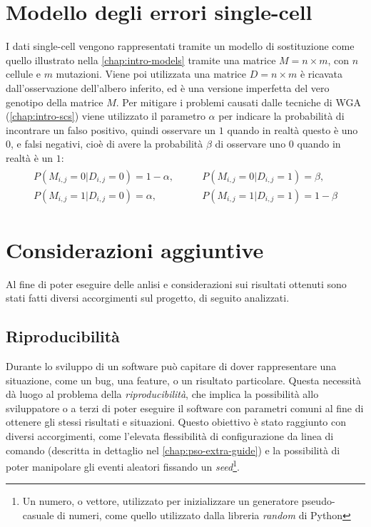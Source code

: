 \subsubsection{}

\section{Modello degli errori single-cell}
\label{chap:pso-matrix}
I dati single-cell vengono rappresentati tramite un modello di sostituzione come quello illustrato nella \autoref{chap:intro-models} tramite una matrice $M = n \times m$, con $n$ cellule e $m$ mutazioni. Viene poi utilizzata una matrice $D = n \times m$ è ricavata dall'osservazione dell'albero inferito, ed è una versione imperfetta del vero genotipo della matrice $M$. Per mitigare i problemi causati dalle tecniche di WGA (\autoref{chap:intro-scs}) viene utilizzato il parametro $\alpha$ per indicare la probabilità di incontrare un falso positivo, quindi osservare un $1$ quando in realtà questo è uno $0$, e falsi negativi, cioè di avere la probabilità $\beta$ di osservare uno $0$ quando in realtà è un $1$:
\begin{align}
    \label{eq:pso-intro-model-matrix}
    \begin{split}
      P(M_{i,j} = 0 | D_{i,j} = 0) = 1 - \alpha, \qquad
      &P(M_{i,j} = 0 | D_{i,j} = 1) = \beta, \\
      P(M_{i,j} = 1 | D_{i,j} = 0) = \alpha, \qquad
      &P(M_{i,j} = 1 | D_{i,j} = 1) = 1 - \beta
    \end{split}
\end{align}

\section{Considerazioni aggiuntive}
Al fine di poter eseguire delle anlisi e considerazioni sui risultati ottenuti sono stati fatti diversi accorgimenti sul progetto, di seguito analizzati.

\subsection{Riproducibilità}
Durante lo sviluppo di un software può capitare di dover rappresentare una situazione, come un bug, una feature, o un risultato particolare. Questa necessità dà luogo al problema della \textit{riproducibilità}, che implica la possibilità allo sviluppatore o a terzi di poter eseguire il software con parametri comuni al fine di ottenere gli stessi risultati e situazioni. Questo obiettivo è stato raggiunto con diversi accorgimenti, come l'elevata flessibilità di configurazione da linea di comando (descritta in dettaglio nel \autoref{chap:pso-extra-guide}) e la possibilità di poter manipolare gli eventi aleatori fissando un \textit{seed}\footnote{Un numero, o vettore, utilizzato per inizializzare un generatore pseudo-casuale di numeri, come quello utilizzato dalla libreria \textit{random} di Python}.

